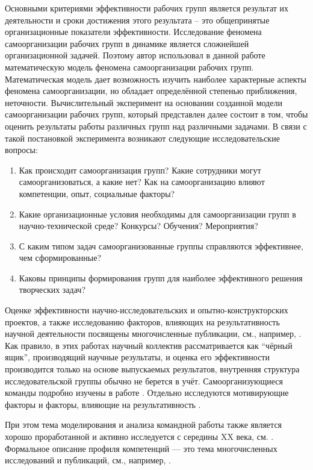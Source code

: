 Основными критериями эффективности рабочих групп является результат их деятельности и сроки достижения этого результата – это общепринятые организационные показатели эффективности.
Исследование феномена самоорганизации рабочих групп в динамике является сложнейшей организационной задачей. 
Поэтому автор использовал в данной работе математическую модель феномена самоорганизации рабочих групп. 
Математическая модель дает возможность изучить наиболее характерные аспекты феномена самоорганизации, но обладает определённой степенью приближения, неточности. 
Вычислительный эксперимент на основании созданной модели самоорганизации рабочих групп, который представлен далее состоит в том, чтобы оценить результаты работы различных групп над различными задачами. 
В связи с такой постановкой эксперимента возникают следующие исследовательские вопросы: 
\begin{enumerate}
\item Как происходит самоорганизация групп? Какие сотрудники могут самоорганизоваться, а какие нет? Как на самоорганизацию влияют компетенции, опыт, социальные факторы?
\item Какие организационные условия необходимы для самоорганизации групп в научно-технической среде? Конкурсы? Обучения? Мероприятия? 
\item С каким типом задач самоорганизованные группы справляются эффективнее, чем сформированные? 
\item Каковы принципы формирования групп для наиболее эффективного решения творческих задач? 
\end{enumerate}

Оценке эффективности научно-исследовательских и опытно-конструкторских проектов, а также исследованию факторов, влияющих на результативность научной деятельности посвящены многочисленные публикации, см., например, \cite{shcherb1982,ovch2009,fursov2016,shmatko2017}.
Как правило, в этих работах научный коллектив рассматривается как ``чёрный ящик'', производящий научные результаты, и оценка его эффективности производится только на основе выпускаемых результатов, внутренняя структура исследовательской группы обычно не берется в учёт. 
Самоорганизующиеся команды подробно изучены в работе \cite{moe2008understanding}.  
Отдельно исследуются мотивирующие факторы \cite{shmatko2017} и факторы, влияющие на результативность \cite{fursov2016}.

При этом тема моделирования и анализа командной работы также является хорошо проработанной и активно исследуется с середины XX века, см. \cite{bavelas1948mathematical,nov2008,bei2014}. 
Формальное описание профиля компетенций --- это тема многочисленных исследований и публикаций, см., например, \cite{rozewski2009competence,bei2014}.

